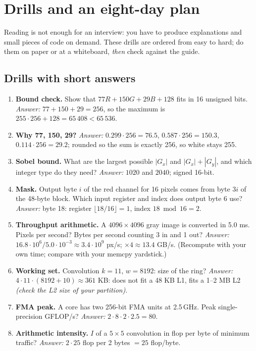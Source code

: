 \chapter{Drills and an eight-day plan}\label{ch:drills}

Reading is not enough for an interview: you have to produce explanations and small pieces of code on demand. These drills are ordered from easy to hard; do them on paper or at a whiteboard, \emph{then} check against the guide.

\section{Drills with short answers}

\begin{enumerate}[leftmargin=*,itemsep=6pt]
\item \textbf{Bound check.} Show that $77R+150G+29B+128$ fits in 16 unsigned bits. \emph{Answer:} $77+150+29=256$, so the maximum is $255\cdot256+128=65\,408<65\,536$.
\item \textbf{Why 77, 150, 29?} \emph{Answer:} $0.299\cdot256=76.5$, $0.587\cdot256=150.3$, $0.114\cdot256=29.2$; rounded so the sum is exactly 256, so white stays 255.
\item \textbf{Sobel bound.} What are the largest possible $|G_x|$ and $|G_x|+|G_y|$, and which integer type do they need? \emph{Answer:} $1020$ and $2040$; signed 16-bit.
\item \textbf{Mask.} Output byte $i$ of the red channel for 16 pixels comes from byte $3i$ of the 48-byte block. Which input register and index does output byte 6 use? \emph{Answer:} byte 18: register $\lfloor18/16\rfloor=1$, index $18\bmod16=2$.
\item \textbf{Throughput arithmetic.} A $4096\times4096$ gray image is converted in 5.0 ms. Pixels per second? Bytes per second counting 3 in and 1 out? \emph{Answer:} $16.8\cdot10^6/5.0\cdot10^{-3}\approx3.4\cdot10^9$ px/s; $\times4\approx13.4$ GB/s. (Recompute with your own time; compare with your memcpy yardstick.)
\item \textbf{Working set.} Convolution $k=11$, $w=8192$: size of the ring? \emph{Answer:} $4\cdot11\cdot(8192+10)\approx361$ KB: does not fit a 48 KB L1, fits a 1--2 MB L2 \emph{(check the L2 size of your partition)}.
\item \textbf{FMA peak.} A core has two 256-bit FMA units at 2.5\,GHz. Peak single-precision GFLOP/s? \emph{Answer:} $2\cdot8\cdot2\cdot2.5=80$.
\item \textbf{Arithmetic intensity.} $I$ of a $5\times5$ convolution in flop per byte of minimum traffic? \emph{Answer:} $2\cdot25$ flop per 2 bytes $=25$ flop/byte.

\end{enumerate}
